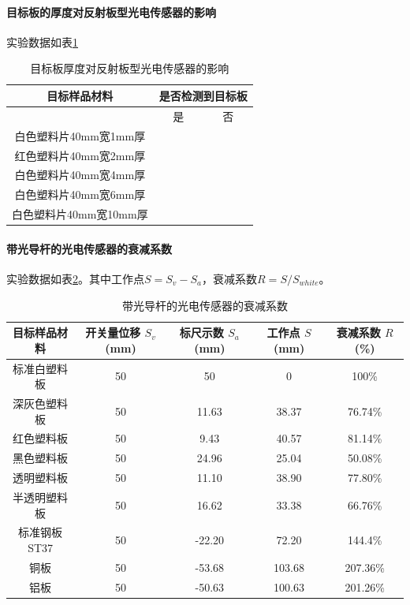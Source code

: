 	\paragraph{目标板的厚度对反射板型光电传感器的影响}
	实验数据如表\ref{tab:lt}
	\begin{table}[htbp]
		\centering
		\begin{tabular}{|c|c|c|}
			\hline
			目标样品材料 & \multicolumn{2}{|c|}{是否检测到目标板} \\
			\hline
			 & 是 & 否 \\
			 \hline
			白色塑料片40mm宽1mm厚 & \checkmark & \quad \\
			红色塑料片40mm宽2mm厚 & \checkmark & \quad \\
			白色塑料片40mm宽4mm厚 & \checkmark & \quad \\
			白色塑料片40mm宽6mm厚 & \checkmark & \quad \\
			白色塑料片40mm宽10mm厚 & \checkmark & \quad \\
			\hline
		\end{tabular}
		\caption{目标板厚度对反射板型光电传感器的影响}
		\label{tab:lt}
	\end{table}

	\paragraph{带光导杆的光电传感器的衰减系数}
	实验数据如表\ref{tab:ls}。其中工作点$S=S_v-S_a$，衰减系数$R=S/S_{white}$。
	\begin{table}[htbp]
		\centering
		\begin{tabular}{|c|c|c|c|c|}
			\hline
			目标样品材料 & 开关量位移 $S_v$(mm) & 标尺示数 $S_a$(mm) & 工作点 $S$(mm) & 衰减系数 $R$(\%) \\
			\hline
			标准白塑料板 & 50 & 50 & 0 & 100\% \\
			深灰色塑料板 & 50 & 11.63 & 38.37 & 76.74\% \\
			红色塑料板 & 50 & 9.43 & 40.57 & 81.14\% \\
			黑色塑料板 & 50 & 24.96 & 25.04 & 50.08\% \\
			透明塑料板 & 50 & 11.10 & 38.90 & 77.80\% \\
			半透明塑料板 & 50 & 16.62 & 33.38 & 66.76\% \\
			标准钢板ST37 & 50 & -22.20 & 72.20 & 144.4\% \\
			铜板 & 50 & -53.68 & 103.68 & 207.36\% \\
			铝板 & 50 & -50.63 & 100.63 & 201.26\% \\
			\hline
		\end{tabular}
		\caption{带光导杆的光电传感器的衰减系数}
		\label{tab:ls}
	\end{table}

